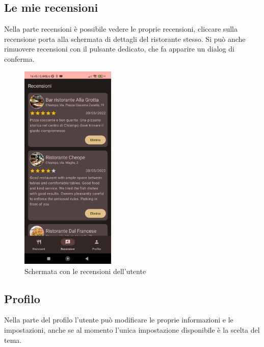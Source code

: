 \documentclass[12pt, a4paper]{report}
\begin{document}
	\subsection{Le mie recensioni}
	Nella parte recensioni è possibile vedere le proprie recensioni, cliccare sulla recensione porta alla schermata di dettagli del ristorante stesso.
	Si può anche rimuovere recensioni con il pulsante dedicato, che fa apparire un dialog di conferma.
	


	\begin{figure}
		\centering
		\includegraphics[width=0.4\textwidth]{screenReviews.jpg} 
	  \caption{Schermata con le recensioni dell'utente}
		
	\end{figure}


	\newpage
	\subsection{Profilo}
		Nella parte del profilo l'utente può modificare le proprie informazioni e le impostazioni, anche se al momento l'unica impostazione disponibile è la scelta del tema.
\end{document}
